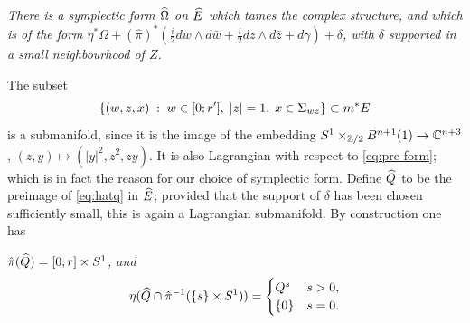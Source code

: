 \documentclass[10pt,letterpaper]{article}
\begin{document}
\begin{condensedprimelist}
\setcounter{enumi}{1}
\item \label{item:model-resolution-two} \em
There is a symplectic form $\widehat{\Omega}$ on $\widehat{E}$ which tames the complex
structure, and which is of the form $\eta^*\Omega + (\hat\pi)^*(\frac{i}{2} dw
\wedge d\bar{w} + \frac{i}{2} dz \wedge d\bar{z} + d\gamma) + \delta$, with
$\delta$ supported in a small neighbourhood of $Z$.
\end{condensedprimelist}

The subset
\begin{equation} \label{eq:hatq}
 \{ (w,z,x) \; : \; w \in [0;r'], \; |z| = 1, \; x \in
 \Sigma_{wz}\} \subset m^*E
\end{equation}
is a submanifold, since it is the image of the embedding $S^1 \times_{\mathbb{Z}/2}
\bar{B}^{n+1}(1) \rightarrow \mathbb{C}^{n+3}$, $(z,y) \mapsto (|y|^2,z^2,zy)$. It is
also Lagrangian with respect to \eqref{eq:pre-form}; which is in fact the
reason for our choice of symplectic form. Define $\widehat{Q}$ to be the preimage of
\eqref{eq:hatq} in $\widehat{E}$; provided that the support of $\delta$ has been
chosen sufficiently small, this is again a Lagrangian submanifold. By
construction one has

\begin{condensedprimelist}
\setcounter{enumi}{2}
\item \label{item:model-resolution-three} \em
$\hat\pi(\widehat{Q}) = [0;r] \times S^1$, and
\[
\eta(\widehat{Q} \cap \hat\pi^{-1}(\{s\} \times S^1)) = \begin{cases} Q^s & s>0,
\\ \{0\} & s = 0.
\end{cases}
\]
\end{condensedprimelist}
\end{document}
